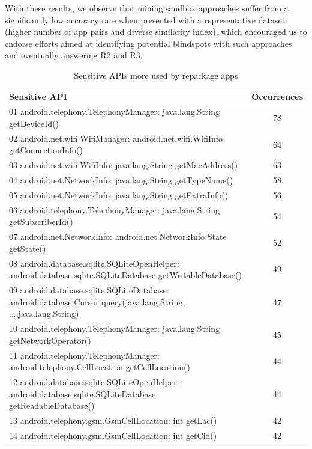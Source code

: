 With these results, we observe that mining sandbox approaches suffer from a significantly low accuracy rate when presented with a representative dataset (higher number of app pairs and diverse similarity index), which encouraged us to endorse efforts aimed at identifying potential blindspots with such approaches and eventually answering R2 and R3.

\begin{table}[t]
  \caption{Sensitive APIs more used by repackage apps}
  \centering
  \begin{small}
 \begin{tabular}{lc}
   \toprule
   Sensitive API & Occurrences \\
   \midrule
   01 android.telephony.TelephonyManager: java.lang.String getDeviceId() &  78 \\
   02 android.net.wifi.WifiManager: android.net.wifi.WifiInfo getConnectionInfo() &  64\\
   03 android.net.wifi.WifiInfo: java.lang.String getMacAddress() &  63 \\
   04 android.net.NetworkInfo: java.lang.String getTypeName() &  58 \\
   05 android.net.NetworkInfo: java.lang.String getExtraInfo() &  56 \\
   06 android.telephony.TelephonyManager: java.lang.String getSubscriberId() &  54 \\
   07 android.net.NetworkInfo: android.net.NetworkInfo State getState() &  52 \\
   08 android.database.sqlite.SQLiteOpenHelper: android.database.sqlite.SQLiteDatabase getWritableDatabase() &  49 \\
   09 android.database.sqlite.SQLiteDatabase: android.database.Cursor query(java.lang.String, ...,java.lang.String) &  47 \\
   10 android.telephony.TelephonyManager: java.lang.String getNetworkOperator() &  45\\
   11 android.telephony.TelephonyManager: android.telephony.CellLocation getCellLocation() &  44\\
   12 android.database.sqlite.SQLiteOpenHelper: android.database.sqlite.SQLiteDatabase getReadableDatabase() &  44\\
   13 android.telephony.gsm.GsmCellLocation: int getLac() &  42 \\
   14 android.telephony.gsm.GsmCellLocation: int getCid() &  42 \\
   

\end{tabular}
\end{small}
\end{table}
